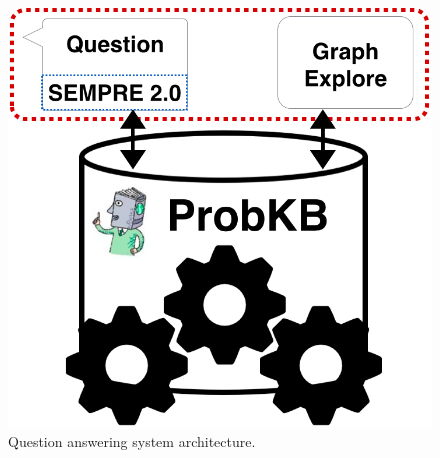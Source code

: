 \begin{figure}
\centering
\includegraphics[width=0.6\columnwidth]{images/probqa-architecture.png}
\caption{Question answering system architecture.}
\label{fig:qaarchitecture}
\end{figure}

